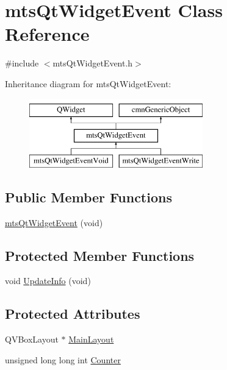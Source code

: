 \hypertarget{classmts_qt_widget_event}{\section{mts\-Qt\-Widget\-Event Class Reference}
\label{classmts_qt_widget_event}
}


{\ttfamily \#include $<$mts\-Qt\-Widget\-Event.\-h$>$}

Inheritance diagram for mts\-Qt\-Widget\-Event\-:\begin{figure}[H]
\begin{center}
\leavevmode
\includegraphics[height=3.000000cm]{df/d13/classmts_qt_widget_event}
\end{center}
\end{figure}
\subsection*{Public Member Functions}
\begin{DoxyCompactItemize}
\item 
\hyperlink{classmts_qt_widget_event_acb55c76a8003771c2dc09048d3572065}{mts\-Qt\-Widget\-Event} (void)
\end{DoxyCompactItemize}
\subsection*{Protected Member Functions}
\begin{DoxyCompactItemize}
\item 
void \hyperlink{classmts_qt_widget_event_a57e32160b00d22e4306e44e712c0696e}{Update\-Info} (void)
\end{DoxyCompactItemize}
\subsection*{Protected Attributes}
\begin{DoxyCompactItemize}
\item 
Q\-V\-Box\-Layout $\ast$ \hyperlink{classmts_qt_widget_event_a9f914a226a59e9181130296046811466}{Main\-Layout}
\item 
unsigned long long int \hyperlink{classmts_qt_widget_event_aad5793fac31d42a9fc1bc8bcd2d265b8}{Counter}
\end{DoxyCompactItemize}



